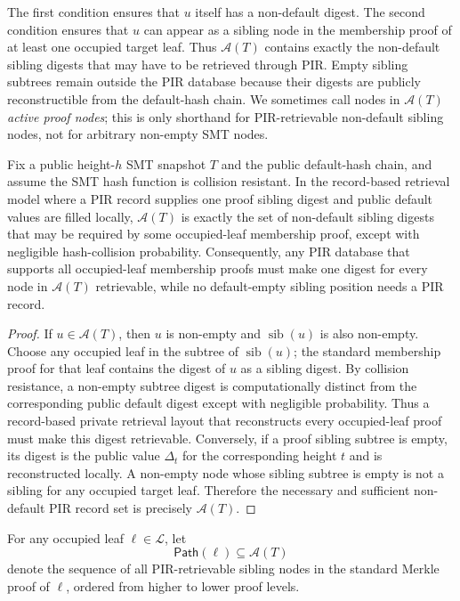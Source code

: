 The first condition ensures that $u$ itself has a non-default digest. The second condition ensures that $u$ can appear as a sibling node in the membership proof of at least one occupied target leaf. Thus $\mathcal{A}(T)$ contains exactly the non-default sibling digests that may have to be retrieved through PIR. Empty sibling subtrees remain outside the PIR database because their digests are publicly reconstructible from the default-hash chain.
We sometimes call nodes in $\mathcal{A}(T)$ \emph{active proof nodes}; this is only shorthand for PIR-retrievable non-default sibling nodes, not for arbitrary non-empty SMT nodes.

\begin{proposition}
\label{prop:active-record-minimality}
Fix a public height-$h$ SMT snapshot $T$ and the public default-hash chain, and assume the SMT hash function is collision resistant. In the record-based retrieval model where a PIR record supplies one proof sibling digest and public default values are filled locally, $\mathcal{A}(T)$ is exactly the set of non-default sibling digests that may be required by some occupied-leaf membership proof, except with negligible hash-collision probability. Consequently, any PIR database that supports all occupied-leaf membership proofs must make one digest for every node in $\mathcal{A}(T)$ retrievable, while no default-empty sibling position needs a PIR record.
\end{proposition}

\begin{proof}
If $u\in\mathcal{A}(T)$, then $u$ is non-empty and $\operatorname{sib}(u)$ is also non-empty. Choose any occupied leaf in the subtree of $\operatorname{sib}(u)$; the standard membership proof for that leaf contains the digest of $u$ as a sibling digest. By collision resistance, a non-empty subtree digest is computationally distinct from the corresponding public default digest except with negligible probability. Thus a record-based private retrieval layout that reconstructs every occupied-leaf proof must make this digest retrievable. Conversely, if a proof sibling subtree is empty, its digest is the public value $\Delta_t$ for the corresponding height $t$ and is reconstructed locally. A non-empty node whose sibling subtree is empty is not a sibling for any occupied target leaf. Therefore the necessary and sufficient non-default PIR record set is precisely $\mathcal{A}(T)$.
\end{proof}

\begin{definition}
For any occupied leaf $\ell \in \mathcal{L}$, let
\[
\mathsf{Path}(\ell)\subseteq \mathcal{A}(T)
\]
denote the sequence of all PIR-retrievable sibling nodes in the standard Merkle proof of $\ell$, ordered from higher to lower proof levels.
\end{definition}

